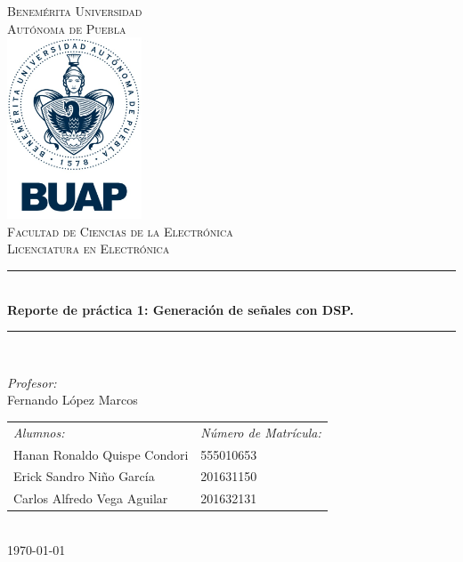 \documentclass[12pt]{article}
\date{\today}
\begin{document}
\begin{titlepage}
\newcommand{\HRule}{\rule{\linewidth}{0.5mm}} 
\center
\textsc{\LARGE  Benemérita Universidad \\[0.2cm] Autónoma de Puebla}\\[1.5cm] 
\includegraphics[width=4cm]{escudo.jpg}\\[1cm]
\textsc{\Large Facultad de Ciencias de la Electrónica}\\[0.5cm] 
\textsc{\large Licenciatura en Electrónica}\\[0.5cm]
\HRule \\[0.4cm]
{ \huge \bfseries Reporte de práctica 1: Generación de señales con DSP.}\\[0.4cm] 
\HRule \\[1.5cm]
\begin{minipage}{\textwidth}
\center 

\emph{Profesor:} \\
Fernando López Marcos \\[1cm]

\begin{tabular}{ll}
\emph{Alumnos:} & \emph{Número de Matrícula:}\\
Hanan Ronaldo Quispe Condori  & 555010653 \\
Erick Sandro Niño García & 201631150\\
Carlos Alfredo Vega Aguilar & 201632131 \\
\end{tabular}
\end{minipage}\\[2cm]
\today
\end{titlepage}



\end{document}
